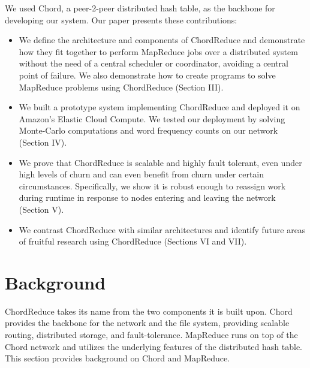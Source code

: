 We used Chord\cite{chord}, a peer-2-peer distributed hash table, as the backbone for developing our system.  Our paper presents these contributions:
\begin{itemize}
	\item We define the architecture and components of ChordReduce and demonstrate how they fit together to perform MapReduce jobs over a distributed system without the need of a central scheduler or coordinator, avoiding a central point of failure. We also demonstrate how to create programs to solve MapReduce problems using ChordReduce (Section III). 
	\item We built a prototype system implementing ChordReduce and deployed it on Amazon's Elastic Cloud Compute.  We tested our deployment by solving Monte-Carlo computations and word frequency counts on our network (Section IV).
	\item We prove that ChordReduce is scalable and highly fault tolerant, even under high levels of churn and can even benefit from churn under certain circumstances. Specifically, we show it is robust enough to reassign work during runtime in response to nodes entering and leaving the network (Section V).
	\item We contrast ChordReduce with similar architectures and identify future areas of fruitful research using ChordReduce (Sections  VI and VII). 





\end{itemize}

\section{Background}
ChordReduce takes its name from the two components it is built upon.  Chord\cite{chord} provides the backbone for the network and the file system, providing scalable routing, distributed storage, and fault-tolerance.   MapReduce runs on top of the Chord network and utilizes the underlying features of the distributed hash table.  This section provides background on Chord and MapReduce.



